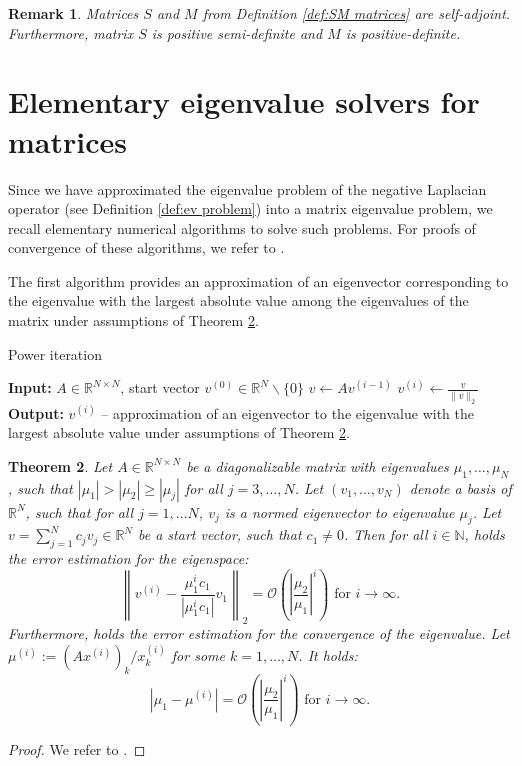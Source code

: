 \documentclass[a4paper,11pt,bibliography=totoc,listof=totoc,headinclude=true,cleardoublepage=empty,oneside]{scrbook}
\newtheorem{theorem}{Theorem}[chapter]
\newtheorem{rem}[theorem]{Remark}
\newcommand{\R}{\mathbb{R}}
\newcommand{\N}{\mathbb{N}}
\newcommand{\bigO}{\mathcal{O}}
\begin{document}
\begin{rem}
Matrices $S$ and $M$ from Definition \ref{def:SM matrices} are self-adjoint. Furthermore, matrix $S$ is positive semi-definite and $M$ is positive-definite.
\end{rem}


\section{Elementary eigenvalue solvers for matrices}
Since we have approximated the eigenvalue problem of the negative Laplacian operator (see Definition \ref{def:ev problem}) into a matrix eigenvalue problem, we recall elementary numerical algorithms to solve such problems. For proofs of convergence of these algorithms, we refer to \cite{numericsAB}.

The first algorithm provides an approximation of an eigenvector corresponding to the eigenvalue with the largest absolute value among the eigenvalues of the matrix  under assumptions of Theorem \ref{theorem:power iteration}.

\begin{algorithm}[H]
\caption{Power iteration}\label{alg:power iteration}
\begin{algorithmic}
    \State \textbf{Input:} $A \in \R^{N \times N}$, start vector $v^{(0)}\in \R^N \backslash\{0\}$
        \State $v \gets Av^{(i-1)} $
        \State $v^{(i)} \gets \frac{v}{\|v\|_2}$
    \EndFor
    \State \textbf{Output:} $v^{(i)}$ -- approximation of an eigenvector to the eigenvalue with the largest absolute value under assumptions of Theorem \ref{theorem:power iteration}.
    \end{algorithmic}
\end{algorithm}
\begin{theorem}\label{theorem:power iteration}
Let $A \in \R^{N \times N}$ be a diagonalizable matrix with eigenvalues $\mu_1, \dots, \mu_N$, such that $|\mu_1| > |\mu_2| \geq |\mu_j|$ for all $j = 3,\dots,N$. Let $(v_1, \dots, v_N)$ denote a basis of $\R^N$, such that for all $j=1, \dots N$, $v_j$ is a normed eigenvector to eigenvalue $\mu_j$. Let $v = \sum_{j=1}^N c_j v_j \in \R^N$ be a start vector, such that $c_1 \neq 0$. Then for all $i \in \N$, holds the error estimation for the eigenspace:
\begin{equation*}
        \left\| v^{(i)} - \frac{\mu_1^i c_1}{|\mu_1^i c_1|} v_1 \right\|_2 = \bigO\left( \left|\frac{\mu_2}{\mu_1}\right|^i\right) \text{ for } i \rightarrow \infty.
\end{equation*}
Furthermore, holds the error estimation for the convergence of the eigenvalue. Let $\mu^{(i)} := (Ax^{(i)})_k / x^{(i)}_k $ for some $k = 1, \dots, N$. It holds:
    \begin{equation*}
        |\mu_1 - \mu^{(i)}| = \bigO\left( \left|\frac{\mu_2}{\mu_1}\right|^i\right) \text{ for } i \rightarrow \infty.
    \end{equation*}
\end{theorem}
\begin{proof}
We refer to \cite[p. 116]{numericsAB}.
\end{proof}
\end{document}
